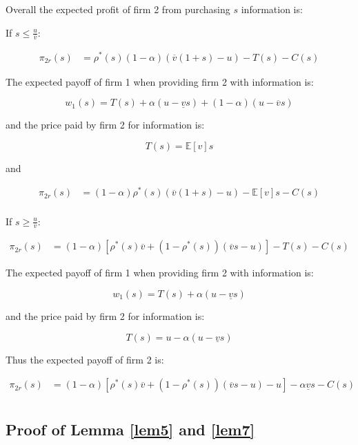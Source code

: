 \documentclass[a4paper,leqno]{article}%
\newcommand{\E}{\mathbb E}
\renewcommand{\a}{\alpha}
\newcommand{\uv}{\underline{v}}
\newcommand{\ov}{\overline{v}}
\begin{document}
Overall the expected profit of firm 2 from purchasing $s$ information is:

If $s\leq\frac{u}{\ov}$:

\begin{equation}
    \begin{aligned}
\pi_{2r}(s)&=\rho^*(s)(1-\a)(\ov(1+s)-u)-T(s)-C(s)
\end{aligned}
\end{equation}

The expected payoff of firm 1 when providing firm 2 with information is:

$$w_1(s)=T(s)+\a(u-\uv s)+(1-\a)(u-\ov s)$$

and the price paid by firm 2 for information is:

$$T(s)=\E[v]s$$

and 

\begin{equation}
    \begin{aligned}
\pi_{2r}(s)&=(1-\a)\rho^*(s)(\ov(1+s)-u)-\E[v]s-C(s)\\
\end{aligned}
\end{equation}



If $s\geq\frac{u}{\ov}$:

\begin{equation}
    \begin{aligned}
\pi_{2r}(s)&=(1-\a)[\rho^*(s)\ov+(1-\rho^*(s))(\ov s-u)]-T(s)-C(s)
\end{aligned}
\end{equation}

The expected payoff of firm 1 when providing firm 2 with information is:

$$w_1(s)=T(s)+\a(u-\uv s)$$

and the price paid by firm 2 for information is:

$$T(s)=u-\a(u-\uv s)$$

Thus the expected payoff of firm 2 is:

\begin{equation}
    \begin{aligned}
\pi_{2r}(s)&=(1-\a)[\rho^*(s)\ov+(1-\rho^*(s))(\ov s-u)-u]-\a\uv s-C(s)\\
    \end{aligned}
\end{equation}

\subsection{Proof of Lemma \ref{lem5}  and \ref{lem7}}\label{lem5p}
\end{document}
